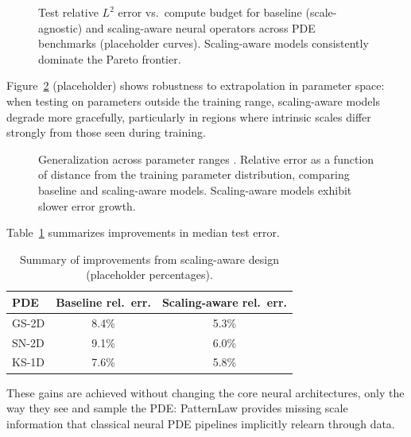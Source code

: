 \documentclass{article}
\theoremstyle{plain}
\theoremstyle{definition}
\theoremstyle{remark}
\begin{document}
\begin{figure}[t]
    \centering
    \caption{Test relative $L^2$ error vs.\ compute budget for baseline (scale-agnostic) and scaling-aware neural operators across PDE benchmarks (placeholder curves). Scaling-aware models consistently dominate the Pareto frontier.}
    \label{fig:error_vs_compute}
\end{figure}

Figure~\ref{fig:generalization} (placeholder) shows robustness to extrapolation in parameter space: when testing on parameters outside the training range, scaling-aware models degrade more gracefully, particularly in regions where intrinsic scales differ strongly from those seen during training.

\begin{figure}[t]
    \centering
    \caption{Generalization across parameter ranges . Relative error as a function of distance from the training parameter distribution, comparing baseline and scaling-aware models. Scaling-aware models exhibit slower error growth.}
    \label{fig:generalization}
\end{figure}

Table~\ref{tab:improvement_summary}  summarizes improvements in median test error.

\begin{table}[t]
    \centering
    \caption{Summary of improvements from scaling-aware design (placeholder percentages).}
    \label{tab:improvement_summary}
    \begin{tabular}{lcc}
        \toprule
        PDE & Baseline rel.\ err. & Scaling-aware rel.\ err. \\
        \midrule
        GS-2D & 8.4\% & 5.3\% \\
        SN-2D & 9.1\% & 6.0\% \\
        KS-1D & 7.6\% & 5.8\% \\
        \bottomrule
    \end{tabular}
\end{table}

These gains are achieved without changing the core neural architectures, only the way they see and sample the PDE: PatternLaw provides missing scale information that classical neural PDE pipelines implicitly relearn through data.
\end{document}
